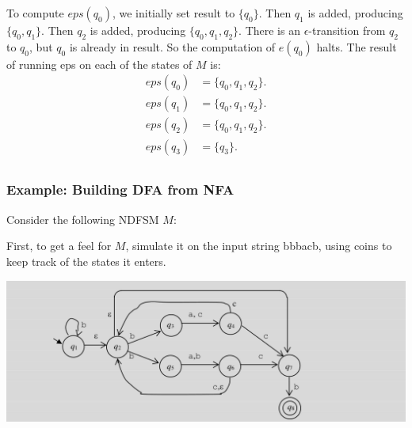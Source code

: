 \documentclass{article}
\begin{document}
To compute $eps(q_0)$, we initially set result to $\{q_0\}$. Then $q_1$ is added, producing $\{q_0, q_1\}$. Then $q_2$ is added, producing
$\{q_0, q_1, q_2\}$. There is an $\epsilon$-transition from $q_2$ to $q_0$, but $q_0$ is already in result. So the computation of $e(q_0)$ halts.
The result of running eps on each of the states of $M$ is:
\begin{align*}
		eps(q_0)&= \{q_0, q_1, q_2\}.\\
		eps(q_1)&= \{q_0, q_1, q_2\}.\\
		eps(q_2)&= \{q_0, q_1, q_2\}.\\
		eps(q_3)&= \{q_3\}.\\
\end{align*}

\subsubsection{Example: Building DFA from NFA}

Consider the following NDFSM $M$:

First, to get a feel for $M$, simulate it on the input string bbbacb, using coins
to keep track of the states it enters.



\includegraphics[width=\linewidth]{./img/ndfsmtodfsm1.png}
\end{document}
